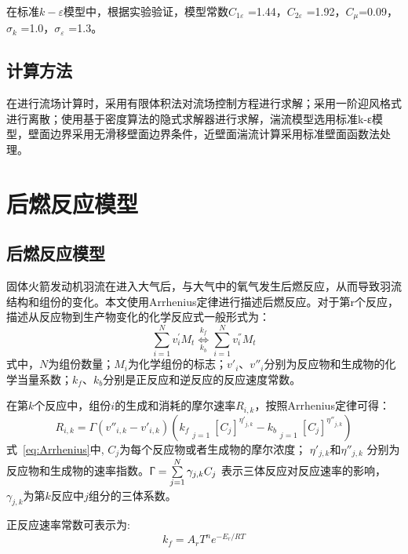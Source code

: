 在标准$k-\varepsilon$模型中，根据实验验证，模型常数$C_{1\varepsilon}$ =1.44，$C_{2\varepsilon}$ =1.92，$C_\mu$=0.09，$\sigma_k$ =1.0，$\sigma_\varepsilon$ =1.3。

\subsection{计算方法}
在进行流场计算时，采用有限体积法对流场控制方程进行求解；采用一阶迎风格式进行离散；使用基于密度算法的隐式求解器进行求解，湍流模型选用标准k-ε模型，壁面边界采用无滑移壁面边界条件，近壁面湍流计算采用标准壁面函数法处理。
\section{后燃反应模型}
\subsection{后燃反应模型}
固体火箭发动机羽流在进入大气后，与大气中的氧气发生后燃反应，从而导致羽流结构和组份的变化。本文使用Arrhenius定律进行描述后燃反应。对于第r个反应，描述从反应物到生产物变化的化学反应式一般形式为：
\begin{equation}
\sum_{i=1}^N v_i^{\prime} M_t \overset{k_f}{\underset{k_b}{\Longleftrightarrow}}\sum_{i=1}^N v_i^{''} M_t
\end{equation}
式中，$N$为组份数量；$M_i$为化学组份的标志；$v'_i$、$v''_i$分别为反应物和生成物的化学当量系数；$k_f$、$k_b$分别是正反应和逆反应的反应速度常数。

在第$k$个反应中，组份$i$的生成和消耗的摩尔速率$R_{i,k}$，按照Arrhenius定律可得：
\begin{equation}
{R_{i,k}} = \Gamma \left( {{{v''}_{i,k}} - {{v'}_{i,k}}} \right)\left( {{k_f}\mathop {\mathop \Pi \limits^N }\limits_{j = 1} {{\left[ {{C_j}} \right]}^{{{\eta '}_{j,k}}}} - {k_b}\mathop {\mathop \Pi \limits^N }\limits_{j = 1} {{\left[ {{C_j}} \right]}^{{{\eta ''}_{j,k}}}}} \right) \label{eq:Arrhenius}
\end{equation}
式~\ref{eq:Arrhenius}中, $C_j$为每个反应物或者生成物的摩尔浓度； $\eta'_{j,k}$和$\eta''_{j,k}$ 分别为反应物和生成物的速率指数。$\Upgamma= \sum\limits_{j=1}^{N} \gamma_{j,k} C_j$ 表示三体反应对反应速率的影响， $\gamma_{j,k}$为第$k$反应中$j$组分的三体系数。

正反应速率常数可表示为:
\begin{equation}
k_f = A_r T^n e^{-E_r/RT}\label{eq:fyslcs}
\end{equation}

